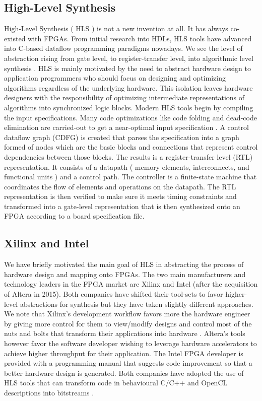 \subsection{High-Level Synthesis}
High-Level Synthesis ( HLS ) is not a new invention at all. It has always co-existed with FPGAs. From initial research into HDLs, HLS tools have advanced into C-based dataflow programming paradigms nowadays. We see the level of abstraction rising from gate level, to register-transfer level, into algorithmic level synthesis \cite{Gupta2008, hlssurv}. HLS is mainly motivated by the need to abstract hardware design to application programmers who should focus on designing and optimizing algorithms regardless of the underlying hardware. This isolation leaves hardware designers with the responsibility of optimizing intermediate representations of algorithms into synchronized logic blocks. 
Modern HLS tools begin by compiling the input specifications. Many code optimizations like code folding and dead-code elimination are carried-out to get a near-optimal input specification \cite{Gupta2008}. A control dataflow graph (CDFG) is created that parses the specification into a graph formed of nodes which are the basic blocks and connections that represent control dependencies between those blocks. The results is a register-transfer level (RTL) representation. It consists of a datapath ( memory elements, interconnects, and functional units ) and a control path. The controller is a finite-state machine that coordinates the flow of elements and operations on the datapath. The RTL representation is then verified to make sure it meets timing constraints and transformed into a gate-level representation that is then synthesized onto an FPGA according to a board specification file. 

\subsection{Xilinx and Intel} 
We have briefly motivated the main goal of HLS in abstracting the process of hardware design and mapping onto FPGAs. The two main manufacturers and technology leaders in the FPGA market are Xilinx and Intel (after the acquisition of Altera in 2015). Both companies have shifted their tool-sets to favor higher-level abstractions for synthesis but they have taken slightly different approaches. We note that Xilinx’s development workflow favors more the hardware engineer by giving more control for them to view/modify designs and control most of the nuts and bolts that transform their applications into hardware \cite{xilinxreference}. Altera’s tools however favor the software developer wishing to leverage hardware accelerators to achieve higher throughput for their application. The Intel FPGA developer is provided with a programming manual that suggests code improvement so that a better hardware design is generated. Both companies have adopted the use of HLS tools that can transform code in behavioural C/C++ and OpenCL descriptions into bitstreams \cite{xilinxreference, intel2016sdk}.

